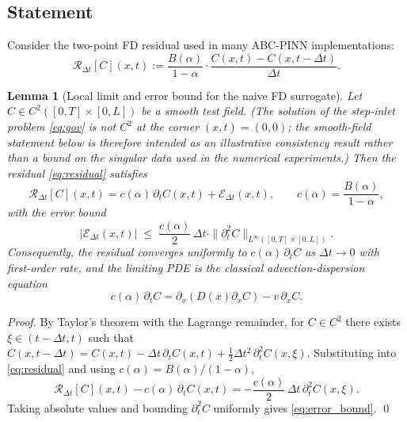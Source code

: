 \documentclass[11pt]{article}
\newtheorem{lemma}{Lemma}
\begin{document}
\subsection{Statement}

Consider the two-point FD residual used in many ABC-PINN implementations:
\begin{equation}
\mathcal{R}_{\Delta t}[C](x,t) := \frac{B(\alpha)}{1-\alpha}\cdot\frac{C(x,t)-C(x,t-\Delta t)}{\Delta t}.
\label{eq:residual}
\end{equation}

\begin{lemma}[Local limit and error bound for the naive FD surrogate]
\label{prop:local_limit}
Let \(C \in C^2([0,T]\times[0,L])\) be a smooth test field. (The solution of the step-inlet problem \eqref{eq:gov} is not \(C^2\) at the corner \((x,t)=(0,0)\); the smooth-field statement below is therefore intended as an illustrative consistency result rather than a bound on the singular data used in the numerical experiments.) Then the residual \eqref{eq:residual} satisfies
\begin{equation}
\mathcal{R}_{\Delta t}[C](x,t) = c(\alpha)\,\partial_t C(x,t) + \mathcal{E}_{\Delta t}(x,t),
\qquad c(\alpha) = \frac{B(\alpha)}{1-\alpha},
\end{equation}
with the error bound
\begin{equation}
|\mathcal{E}_{\Delta t}(x,t)| \;\leq\; \frac{c(\alpha)}{2}\,\Delta t \cdot \|\partial_t^2 C\|_{L^\infty([0,T]\times[0,L])}.
\label{eq:error_bound}
\end{equation}
Consequently, the residual converges uniformly to \(c(\alpha)\,\partial_t C\) as \(\Delta t \to 0\) with first-order rate, and the limiting PDE is the classical advection-dispersion equation
\begin{equation}
c(\alpha)\,\partial_t C = \partial_x\!\left(D(x)\partial_x C\right) - v\,\partial_x C.
\label{eq:classical_rescaled}
\end{equation}
\end{lemma}

\begin{proof}
By Taylor's theorem with the Lagrange remainder, for \(C \in C^2\) there exists \(\xi \in (t-\Delta t, t)\) such that
\(C(x,t-\Delta t) = C(x,t) - \Delta t\,\partial_t C(x,t) + \tfrac{1}{2}\Delta t^2\,\partial_t^2 C(x,\xi)\).
Substituting into \eqref{eq:residual} and using \(c(\alpha) = B(\alpha)/(1-\alpha)\),
\begin{equation}
\mathcal{R}_{\Delta t}[C](x,t) - c(\alpha)\,\partial_t C(x,t) = -\frac{c(\alpha)}{2}\,\Delta t\,\partial_t^2 C(x,\xi).
\end{equation}
Taking absolute values and bounding \(\partial_t^2 C\) uniformly gives \eqref{eq:error_bound}. \qed
\end{proof}
\end{document}
